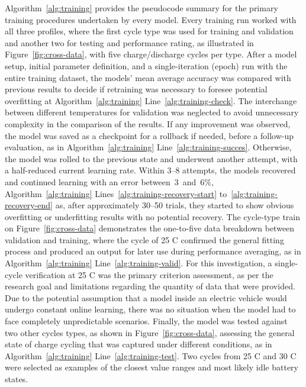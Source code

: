 %
Algorithm~\ref{alg:training} provides the pseudocode summary for the primary training procedures undertaken by every model.
Every training run worked with all three profiles, where the first cycle type was used for training and validation and another two for testing and performance rating, as illustrated in Figure~\ref{fig:cross-data}, with five charge/discharge cycles per type.
After a model setup, initial parameter definition, and a single-iteration (epoch) run with the entire training dataset, the models' mean average accuracy was compared with previous results to decide if retraining was necessary to foresee potential overfitting at Algorithm~\ref{alg:training} Line~\ref{alg:training-check}.
The interchange between different temperatures for validation was neglected to avoid unnecessary complexity in the comparison of the results.
If any improvement was observed, the model was saved as a checkpoint for a rollback if needed, before a follow-up evaluation, as in Algorithm~\ref{alg:training} Line~\ref{alg:training-succes}.
Otherwise, the model was rolled to the previous state and underwent another attempt, with a half-reduced current learning rate.
Within 3--8 attempts, the models recovered and continued learning with an error \mbox{between 3 and 6\%}, Algorithm~\ref{alg:training} Lines~\ref{alg:training-recovery-start} to~\ref{alg:training-recovery-end} as, after approximately 30--50 trials, they started to show obvious overfitting or underfitting results with no potential recovery.
The cycle-type train on Figure~\ref{fig:cross-data} demonstrates the one-to-five data breakdown between validation and training, where the cycle of 25 \textdegree{}C confirmed the general fitting process and produced an output for later use during performance averaging, as in Algorithm~\ref{alg:training} Line~\ref{alg:training-valid}.
For this investigation, a single-cycle verification at 25 \textdegree{}C was the primary criterion assessment, as per the research goal and limitations regarding the quantity of data that were provided.
Due to the potential assumption that a model inside an electric vehicle would undergo constant online learning, there was no situation when the model had to face completely unpredictable scenarios.
Finally, the model was tested against two other cycles types, as shown in Figure~\ref{fig:cross-data}, assessing the general state of charge cycling that was captured under different conditions, as in Algorithm~\ref{alg:training} Line~\ref{alg:training-test}.
Two cycles from 25 \textdegree{}C and 30 \textdegree{}C were selected as examples of the closest value ranges and most likely idle battery states.
